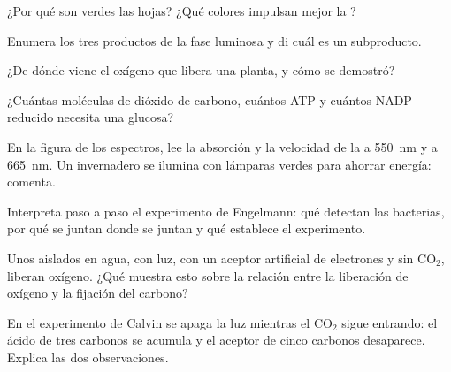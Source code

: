 \begin{exercise}[$\star$]\label{exo:g12:photosynthesis:2}
¿Por qué son verdes las hojas? ¿Qué colores impulsan mejor la
?
\end{exercise}

\begin{exercise}[$\star$]\label{exo:g12:photosynthesis:3}
Enumera los tres productos de la fase luminosa y di cuál es un
subproducto.
\end{exercise}

\begin{exercise}[$\star$]\label{exo:g12:photosynthesis:4}
¿De dónde viene el oxígeno que libera una planta, y cómo se demostró?
\end{exercise}

\begin{exercise}[$\star$]\label{exo:g12:photosynthesis:5}
¿Cuántas moléculas de dióxido de carbono, cuántos ATP y cuántos NADP
reducido necesita una glucosa?
\end{exercise}

\begin{exercise}[$\star\star$]\label{exo:g12:photosynthesis:6}
En la figura de los espectros, lee la absorción y la velocidad de la
 a \qty{550}{nm} y a \qty{665}{nm}. Un invernadero se
ilumina con lámparas verdes para ahorrar energía: comenta.
\end{exercise}

\begin{exercise}[$\star\star$]\label{exo:g12:photosynthesis:7}
Interpreta paso a paso el experimento de Engelmann: qué detectan las
bacterias, por qué se juntan donde se juntan y qué establece el
experimento.
\end{exercise}

\begin{exercise}[$\star\star$]\label{exo:g12:photosynthesis:8}
Unos  aislados en agua, con luz, con un aceptor artificial
de electrones y sin $\mathrm{CO_2}$, liberan oxígeno. ¿Qué muestra esto
sobre la relación entre la liberación de oxígeno y la fijación del
carbono?
\end{exercise}

\begin{exercise}[$\star\star$]\label{exo:g12:photosynthesis:9}
En el experimento de Calvin se apaga la luz mientras el
$\mathrm{CO_2}$ sigue entrando: el ácido de tres carbonos se acumula y
el aceptor de cinco carbonos desaparece. Explica las dos observaciones.
\end{exercise}

